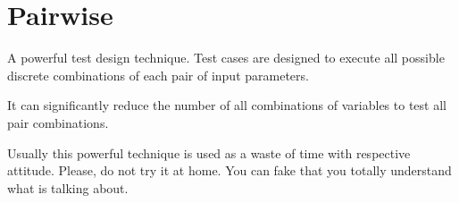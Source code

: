 \section{Pairwise}
\label{sec:Pairwise}

A powerful test design technique. Test cases are designed to execute all possible discrete combinations of each pair of input parameters. 

It can significantly reduce the number of all combinations of variables to test all pair combinations.

Usually this powerful technique is used as a waste of time with respective attitude. Please, do not try it at home. You can fake that you totally understand what is talking about.
